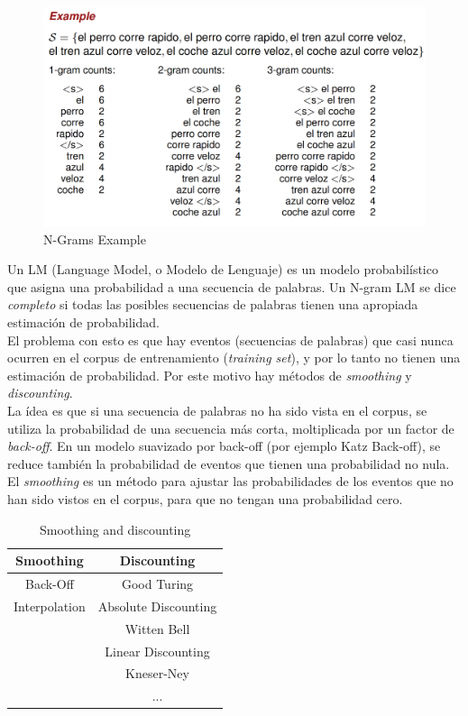 \begin{figure}[htbp]
   \centering
   \includegraphics{images/07/ngramExample.png}
   \caption{N-Grams Example}
   \label{fig:07/ngramExample}
\end{figure}

Un LM (Language Model, o Modelo de Lenguaje) es un modelo probabilístico que asigna una probabilidad a una secuencia de palabras.
Un N-gram LM se dice \textit{completo} si todas las posibles secuencias de palabras tienen una apropiada estimación de probabilidad.\\
El problema con esto es que hay eventos (secuencias de palabras) que casi nunca ocurren en el corpus de entrenamiento (\textit{training set}), y por lo tanto no tienen una estimación de probabilidad.
Por este motivo hay métodos de \textit{smoothing} y \textit{discounting}.\\
La ídea es que si una secuencia de palabras no ha sido vista en el corpus, se utiliza la probabilidad de una secuencia más corta, moltiplicada por un factor de \textit{back-off}.
En un modelo suavizado por back-off (por ejemplo Katz Back-off), se reduce también la probabilidad de eventos que tienen una probabilidad no nula.\\
El \textit{smoothing} es un método para ajustar las probabilidades de los eventos que no han sido vistos en el corpus, para que no tengan una probabilidad cero.


\begin{table}[htbp]
   \centering
   \begin{tabular}{|c|c|}
      \hline
      \textbf{Smoothing} & \textbf{Discounting}\\
      \hline
      Back-Off & Good Turing\\
      Interpolation & Absolute Discounting\\
      & Witten Bell\\
      & Linear Discounting\\
      & Kneser-Ney\\
      & ...\\
      \hline
   \end{tabular}
   \caption{Smoothing and discounting}
   \label{tab:smoothingAndDiscounting}
\end{table}


